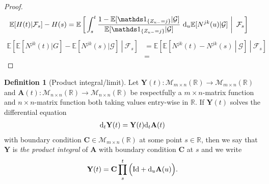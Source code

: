 \documentclass[12pt,letter,twoside]{article}
\theoremstyle{plain}
\theoremstyle{definition}
\newtheorem{definition}[theorem]{Definition}
\theoremstyle{remark}
\begin{document}
\begin{proof}
\begin{align}
\mathbb E[H(t)\vert \mathcal F_s]-H(s)&=\mathbb E\left[\left.\int_s^t\frac{1-\mathbb E[\mathds 1_{\{Z_{u-}=j\}}\vert \mathcal G]}{\mathbb E[\mathds 1_{\{Z_{u-}=j\}}\vert \mathcal G]}\ \text d_u\mathbb E[N^{jk}(u)\vert \mathcal G] \ \right\vert\ \mathcal F_s\right]
\end{align}
\begin{align}
\mathbb E\left[\left.\mathbb E[N^{jk}(t)\vert G] -\mathbb E[N^{jk}(s)\vert \mathcal G] \ \right\vert\ \mathcal F_s\right]&=\mathbb E\left[\left.\mathbb E\left[\left. N^{jk}(t)-N^{jk}(s)\ \right\vert\ \mathcal G\right]  \ \right\vert\ \mathcal F_s\right]\\
&=
\end{align}
\end{proof}

\begin{definition}[Product integral/limit]
Let $\mathbf Y(t) : \mathcal M_{m\times n}(\mathbb R)\to \mathcal M_{m\times n}(\mathbb R)$ and $\mathbf A(t) : \mathcal M_{n\times n}(\mathbb R)\to \mathcal M_{n\times n}(\mathbb R)$ be respectfully a $m\times n$-matrix function and $n\times n$-matrix function both taking values entry-wise in $\mathbb R$. If $\mathbf Y(t)$ solves the differential equation
\begin{align}
\text d_t\mathbf Y(t)=\mathbf Y(t)\text d_t \mathbf A(t)
\end{align}
with boundary condition $\mathbf C\in \mathcal M_{m\times n}(\mathbb R)$ at some point $s\in\mathbb R$, then we say that $\mathbf Y$ is \textit{the product integral} of $\mathbf A$ with boundary condition $\mathbf C$ at $s$ and we write
\begin{align}
\mathbf Y(t)=\mathbf C\prod_{s}^t\Big(\text{Id}+\text d_u\mathbf A(u)\Big).
\end{align}
\end{definition}
\end{document}
